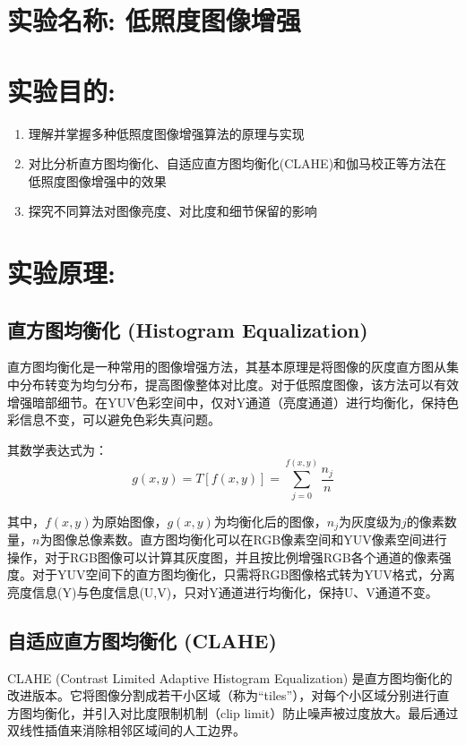 \documentclass[a4paper,11pt,UTF8]{ctexart}
\begin{document}
\section{实验名称: 低照度图像增强}

\section{实验目的:}
\begin{enumerate}
    \item 理解并掌握多种低照度图像增强算法的原理与实现
    \item 对比分析直方图均衡化、自适应直方图均衡化(CLAHE)和伽马校正等方法在低照度图像增强中的效果
    \item 探究不同算法对图像亮度、对比度和细节保留的影响
\end{enumerate}

\section{实验原理:}
\subsection{直方图均衡化 (Histogram Equalization)}
直方图均衡化是一种常用的图像增强方法，其基本原理是将图像的灰度直方图从集中分布转变为均匀分布，提高图像整体对比度。对于低照度图像，该方法可以有效增强暗部细节。在YUV色彩空间中，仅对Y通道（亮度通道）进行均衡化，保持色彩信息不变，可以避免色彩失真问题。

其数学表达式为：
\begin{equation}
g(x,y) = T[f(x,y)] = \sum_{j=0}^{f(x,y)} \frac{n_j}{n}
\end{equation}

其中，$f(x,y)$为原始图像，$g(x,y)$为均衡化后的图像，$n_j$为灰度级为$j$的像素数量，$n$为图像总像素数。直方图均衡化可以在RGB像素空间和YUV像素空间进行操作，对于RGB图像可以计算其灰度图，并且按比例增强RGB各个通道的像素强度。对于YUV空间下的直方图均衡化，只需将RGB图像格式转为YUV格式，分离亮度信息(Y)与色度信息(U,V)，只对Y通道进行均衡化，保持U、V通道不变。
\subsection{自适应直方图均衡化 (CLAHE)}
CLAHE (Contrast Limited Adaptive Histogram Equalization) 是直方图均衡化的改进版本。它将图像分割成若干小区域（称为“tiles”），对每个小区域分别进行直方图均衡化，并引入对比度限制机制（clip limit）防止噪声被过度放大。最后通过双线性插值来消除相邻区域间的人工边界。
\end{document}
